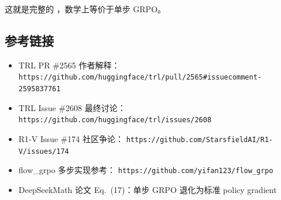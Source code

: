 \begin{summarybox}
这就是完整的 ，数学上等价于单步 GRPO。
\end{summarybox}

\subsection{参考链接}

\begin{itemize}
    \item TRL PR \#2565 作者解释：
          \texttt{https://github.com/huggingface/trl/pull/2565\#issuecomment-2595837761}
    \item TRL Issue \#2608 最终讨论：
          \texttt{https://github.com/huggingface/trl/issues/2608}
    \item R1-V Issue \#174 社区争论：
          \texttt{https://github.com/StarsfieldAI/R1-V/issues/174}
    \item flow\_grpo 多步实现参考：
          \texttt{https://github.com/yifan123/flow\_grpo}
    \item DeepSeekMath 论文 Eq.~(17)：单步 GRPO 退化为标准 policy gradient
\end{itemize}
